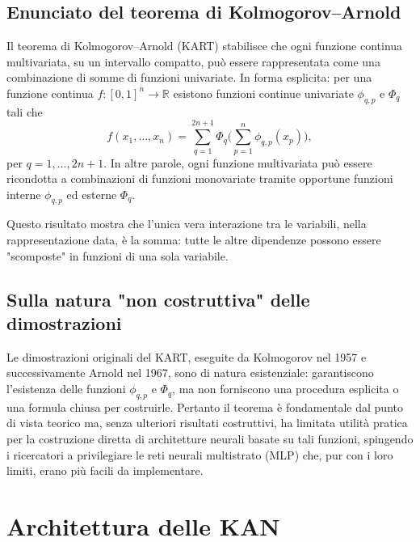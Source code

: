 \documentclass[a4paper,12pt]{report}
\begin{document}
	\subsection{Enunciato del teorema di Kolmogorov--Arnold}
	Il teorema di Kolmogorov--Arnold (KART) stabilisce che ogni funzione continua multivariata, su un intervallo compatto, può essere rappresentata come una combinazione di somme di funzioni univariate. In forma esplicita: per una funzione continua \(f:[0,1]^n \to \mathbb{R}\) esistono funzioni continue univariate \(\phi_{q,p}\) e \(\Phi_q\) tali che
	\[
	f(x_1,\dots,x_n)=\sum_{q=1}^{2n+1}\Phi_q\!\Biggl(\sum_{p=1}^n \phi_{q,p}(x_p)\Biggr),
	\]
	per \(q=1,\dots,2n+1\). In altre parole, ogni funzione multivariata può essere ricondotta a combinazioni di funzioni monovariate tramite opportune funzioni interne \(\phi_{q,p}\) ed esterne \(\Phi_q\).
	
	Questo risultato mostra che l'unica vera interazione tra le variabili, nella rappresentazione data, è la somma: tutte le altre dipendenze possono essere "scomposte" in funzioni di una sola variabile.
	
	\subsection{Sulla natura "non costruttiva" delle dimostrazioni}
	Le dimostrazioni originali del KART, eseguite da Kolmogorov nel 1957 e successivamente Arnold nel 1967, sono di natura esistenziale: garantiscono l'esistenza delle funzioni \(\phi_{q,p}\) e \(\Phi_q\), ma non forniscono una procedura esplicita o una formula chiusa per costruirle. Pertanto il teorema è fondamentale dal punto di vista teorico ma, senza ulteriori risultati costruttivi, ha limitata utilità pratica per la costruzione diretta di architetture neurali basate su tali funzioni, spingendo i ricercatori a privilegiare le reti neurali multistrato (MLP) che, pur con i loro limiti, erano più facili da implementare.
	
	\section{Architettura delle KAN}
	
\end{document}
